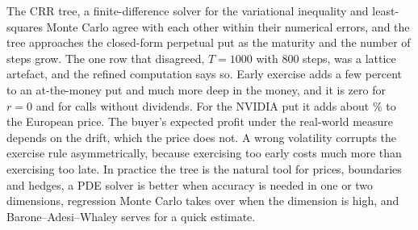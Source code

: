 The CRR tree, a finite-difference solver for the variational inequality and least-squares Monte Carlo agree with each other within their numerical errors, and the tree approaches the closed-form perpetual put as the maturity and the number of steps grow.
The one row that disagreed, $T=1000$ with $800$ steps, was a lattice artefact, and the refined computation says so.
Early exercise adds a few percent to an at-the-money put and much more deep in the money, and it is zero for $r=0$ and for calls without dividends.
For the NVIDIA put it adds about \NvdaPutEEPpct\% to the European price.
The buyer's expected profit under the real-world measure depends on the drift, which the price does not.
A wrong volatility corrupts the exercise rule asymmetrically, because exercising too early costs much more than exercising too late.
In practice the tree is the natural tool for prices, boundaries and hedges, a PDE solver is better when accuracy is needed in one or two dimensions, regression Monte Carlo takes over when the dimension is high, and Barone--Adesi--Whaley serves for a quick estimate.

